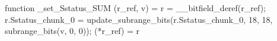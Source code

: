 function _set_Sstatus_SUM (r_ref, v) = {
    r = __bitfield_deref(r_ref);
    r.Sstatus_chunk_0 = update_subrange_bits(r.Sstatus_chunk_0, 18, 18, subrange_bits(v, 0, 0));
    (*r_ref) = r
}
